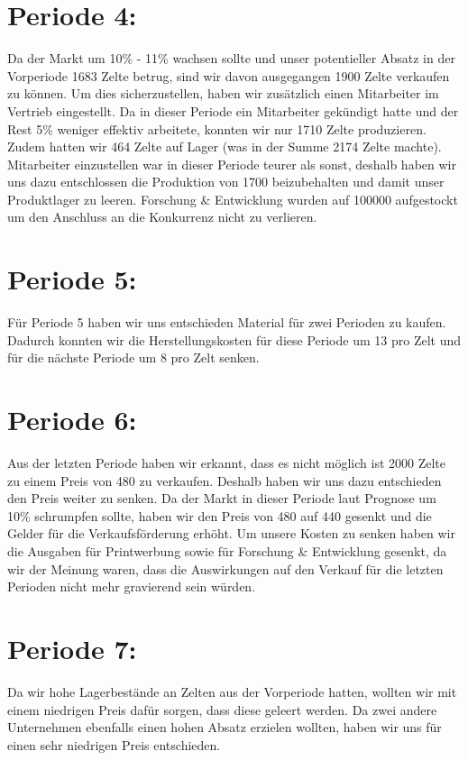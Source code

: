 \documentclass[a4paper, 12pt]{report}
\begin{document}
\begin{flushleft}
\section{Periode 4:}
Da der Markt um 10\% - 11\% wachsen sollte und unser potentieller Absatz in der Vorperiode 1683 Zelte betrug, sind wir davon ausgegangen 1900 Zelte verkaufen zu können.
Um dies sicherzustellen, haben wir zusätzlich einen Mitarbeiter im Vertrieb eingestellt.
Da in dieser Periode ein Mitarbeiter gekündigt hatte und der Rest 5\% weniger effektiv arbeitete, konnten wir nur 1710 Zelte produzieren.
Zudem hatten wir 464 Zelte auf Lager (was in der Summe 2174 Zelte machte).
Mitarbeiter einzustellen war in dieser Periode teurer als sonst,
deshalb haben wir uns dazu entschlossen die Produktion von 1700 beizubehalten und damit unser Produktlager zu leeren.
Forschung \& Entwicklung wurden auf 100000\texteuro{} aufgestockt um den Anschluss an die Konkurrenz nicht zu verlieren.  

\section{Periode 5:}
Für Periode 5 haben wir uns entschieden Material für zwei Perioden zu kaufen.
Dadurch konnten wir die Herstellungskosten für diese Periode um 13\texteuro{} pro Zelt und für die nächste Periode um 8\texteuro{} pro Zelt senken.

\newpage
\section{Periode 6:}
Aus der letzten Periode haben wir erkannt, dass es nicht möglich ist 2000 Zelte zu einem Preis von 480\texteuro{} zu verkaufen.
Deshalb haben wir uns dazu entschieden den Preis weiter zu senken.
Da der Markt in dieser Periode laut Prognose um 10\% schrumpfen sollte, haben wir den Preis von 480\texteuro{} auf 440\texteuro{} gesenkt und die Gelder für die Verkaufsförderung erhöht.
Um unsere Kosten zu senken haben wir die Ausgaben für Printwerbung sowie für Forschung \& Entwicklung gesenkt, da wir der Meinung waren, dass die Auswirkungen auf den Verkauf für die letzten Perioden nicht mehr gravierend sein würden.


\section{Periode 7:}
Da wir hohe Lagerbestände an Zelten aus der Vorperiode hatten, wollten wir mit einem niedrigen Preis dafür sorgen,
dass diese geleert werden.
Da zwei andere Unternehmen ebenfalls einen hohen Absatz erzielen wollten, haben wir uns für einen sehr niedrigen Preis entschieden.



\end{flushleft}
\end{document}
